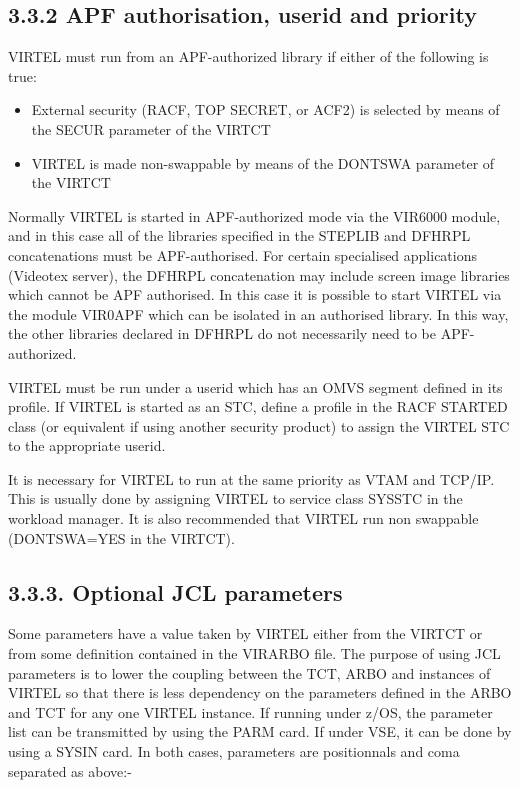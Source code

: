 \documentclass[letterpaper,10pt,english]{sphinxmanual}
\begin{document}
\subsection{3.3.2 APF authorisation, userid and priority}
\label{\detokenize{Installation_Guide:apf-authorisation-userid-and-priority}}
VIRTEL must run from an APF-authorized library if either of the following is true:
\begin{itemize}
\item {} 
External security (RACF, TOP SECRET, or ACF2) is selected by means of the SECUR parameter of the VIRTCT

\item {} 
VIRTEL is made non-swappable by means of the DONTSWA parameter of the VIRTCT

\end{itemize}

Normally VIRTEL is started in APF-authorized mode via the VIR6000 module, and in this case all of the libraries specified in the STEPLIB and DFHRPL concatenations must be APF-authorised. For certain specialised applications (Videotex server), the DFHRPL concatenation may include screen image libraries which cannot be APF authorised. In this case it is possible to start VIRTEL via the module VIR0APF which can be isolated in an authorised library. In this way, the other libraries declared in DFHRPL do not necessarily need to be APF-authorized.

VIRTEL must be run under a userid which has an OMVS segment defined in its profile. If VIRTEL is started as an STC, define a profile in the RACF STARTED class (or equivalent if using another security product) to assign the VIRTEL STC to the appropriate userid.

It is necessary for VIRTEL to run at the same priority as VTAM and TCP/IP. This is usually done by assigning VIRTEL to service class SYSSTC in the workload manager. It is also recommended that VIRTEL run non swappable (DONTSWA=YES in the VIRTCT).


\subsection{3.3.3. Optional JCL parameters}
\label{\detokenize{Installation_Guide:optional-jcl-parameters}}
Some parameters have a value taken by VIRTEL either from the VIRTCT or from some definition contained in the
VIRARBO file. The purpose of using JCL parameters is to lower the coupling between the TCT, ARBO and instances of
VIRTEL so that there is less dependency on the parameters defined in the ARBO and TCT for any one VIRTEL instance.
If running under z/OS, the parameter list can be transmitted by using the PARM card. If under VSE, it can be done by
using a SYSIN card. In both cases, parameters are positionnals and coma separated as above:-
\end{document}
